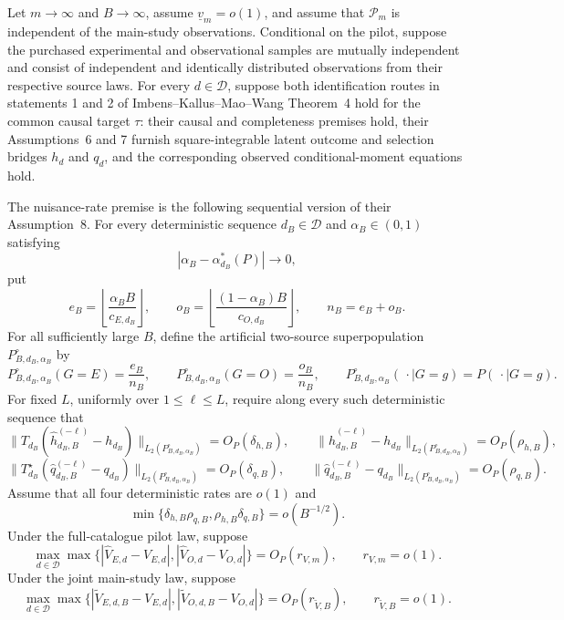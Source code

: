 Let \(m\to\infty\) and \(B\to\infty\), assume \(\underline v_m=o(1)\), and assume that \(\mathcal P_m\) is independent of the main-study observations.  Conditional on the pilot, suppose the purchased experimental and observational samples are mutually independent and consist of independent and identically distributed observations from their respective source laws.  For every \(d\in\mathcal D\), suppose both identification routes in statements 1 and 2 of Imbens--Kallus--Mao--Wang Theorem~4 hold for the common causal target \(\tau\): their causal and completeness premises hold, their Assumptions~6 and 7 furnish square-integrable latent outcome and selection bridges \(h_d\) and \(q_d\), and the corresponding observed conditional-moment equations hold.

The nuisance-rate premise is the following sequential version of their Assumption~8.  For every deterministic sequence \(d_B\in\mathcal D\) and \(\alpha_B\in(0,1)\) satisfying
\[
 |\alpha_B-\alpha_{d_B}^*(P)|\longrightarrow0,
\]
put
\[
 e_B=\left\lfloor\frac{\alpha_BB}{c_{E,d_B}}\right\rfloor,
 \qquad
 o_B=\left\lfloor\frac{(1-\alpha_B)B}{c_{O,d_B}}\right\rfloor,
 \qquad n_B=e_B+o_B.
\]
For all sufficiently large \(B\), define the artificial two-source superpopulation \(P_{B,d_B,\alpha_B}^{\circ}\) by
\[
 P_{B,d_B,\alpha_B}^{\circ}(G=E)=\frac{e_B}{n_B},
 \qquad
 P_{B,d_B,\alpha_B}^{\circ}(G=O)=\frac{o_B}{n_B},
 \qquad
 P_{B,d_B,\alpha_B}^{\circ}(\,\cdot\mid G=g)=P(\,\cdot\mid G=g).
\]
For fixed \(L\), uniformly over \(1\le\ell\le L\), require along every such deterministic sequence that
\[
 \bigl\|T_{d_B}(\widehat h_{d_B,B}^{(-\ell)}-h_{d_B})\bigr\|_{L_2(P_{B,d_B,\alpha_B}^{\circ})}
 =O_P(\delta_{h,B}),
 \qquad
 \bigl\|\widehat h_{d_B,B}^{(-\ell)}-h_{d_B}\bigr\|_{L_2(P_{B,d_B,\alpha_B}^{\circ})}
 =O_P(\rho_{h,B}),
\]
\[
 \bigl\|T_{d_B}^{\star}(\widehat q_{d_B,B}^{(-\ell)}-q_{d_B})\bigr\|_{L_2(P_{B,d_B,\alpha_B}^{\circ})}
 =O_P(\delta_{q,B}),
 \qquad
 \bigl\|\widehat q_{d_B,B}^{(-\ell)}-q_{d_B}\bigr\|_{L_2(P_{B,d_B,\alpha_B}^{\circ})}
 =O_P(\rho_{q,B}).
\]
Assume that all four deterministic rates are \(o(1)\) and
\[
 \min\{\delta_{h,B}\rho_{q,B},\rho_{h,B}\delta_{q,B}\}=o(B^{-1/2}).
\]
Under the full-catalogue pilot law, suppose
\[
 \max_{d\in\mathcal D}\max\bigl\{
 |\widehat V_{E,d}-V_{E,d}|,
 |\widehat V_{O,d}-V_{O,d}|\bigr\}=O_P(r_{V,m}),
 \qquad r_{V,m}=o(1).
\]
Under the joint main-study law, suppose
\[
 \max_{d\in\mathcal D}\max\bigl\{
 |\widetilde V_{E,d,B}-V_{E,d}|,
 |\widetilde V_{O,d,B}-V_{O,d}|\bigr\}
 =O_P(r_{\widetilde V,B}),
 \qquad r_{\widetilde V,B}=o(1).
\]

